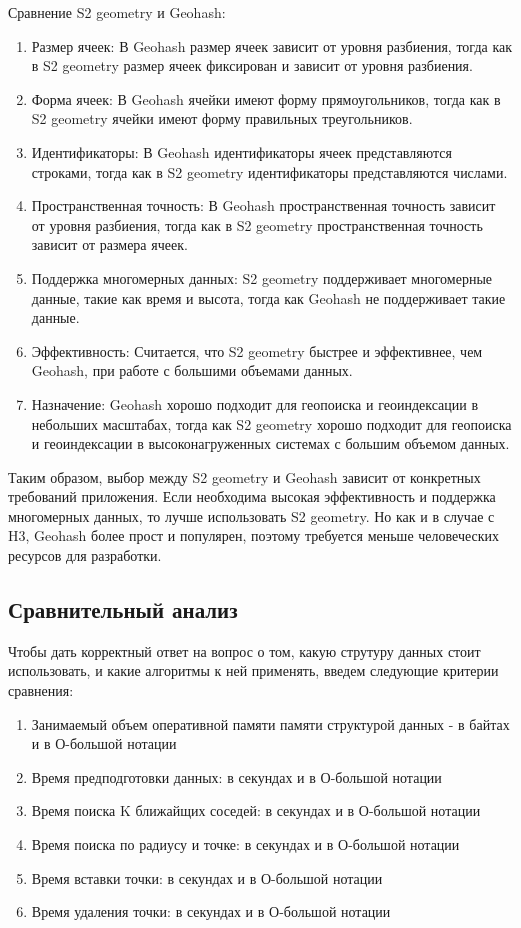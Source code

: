 Сравнение S2 geometry и Geohash:
\begin{enumerate}
    \item Размер ячеек: В Geohash размер ячеек зависит от уровня разбиения, тогда как в S2 geometry размер ячеек фиксирован и зависит от уровня разбиения.
    \item Форма ячеек: В Geohash ячейки имеют форму прямоугольников, тогда как в S2 geometry ячейки имеют форму правильных треугольников.
    \item Идентификаторы: В Geohash идентификаторы ячеек представляются строками, тогда как в S2 geometry идентификаторы представляются числами.
    \item Пространственная точность: В Geohash пространственная точность зависит от уровня разбиения, тогда как в S2 geometry пространственная точность зависит от размера ячеек.
    \item Поддержка многомерных данных: S2 geometry поддерживает многомерные данные, такие как время и высота, тогда как Geohash не поддерживает такие данные.
    \item Эффективность: Считается, что S2 geometry быстрее и эффективнее, чем Geohash, при работе с большими объемами данных.
    \item Назначение: Geohash хорошо подходит для геопоиска и геоиндексации в небольших масштабах, тогда как S2 geometry хорошо подходит для геопоиска и геоиндексации в высоконагруженных системах с большим объемом данных.
\end{enumerate}

Таким образом, выбор между S2 geometry и Geohash зависит от конкретных требований приложения. Если необходима высокая эффективность и поддержка многомерных данных, то лучше использовать S2 geometry. Но как и в случае с H3, Geohash более прост и популярен, поэтому требуется меньше человеческих ресурсов для разработки.

\subsection{Сравнительный анализ}
Чтобы дать корректный ответ на вопрос о том, какую струтуру данных стоит использовать, и какие алгоритмы к ней применять, введем следующие критерии сравнения:
\begin{enumerate}
    \item Занимаемый объем оперативной памяти памяти структурой данных - в байтах и в О-большой нотации
    \item Время предподготовки данных: в секундах и в О-большой нотации
    \item Время поиска K ближайщих соседей: в секундах и в О-большой нотации
    \item Время поиска по радиусу и точке: в секундах и в О-большой нотации
    \item Время вставки точки: в секундах и в О-большой нотации
    \item Время удаления точки: в секундах и в О-большой нотации
\end{enumerate}


